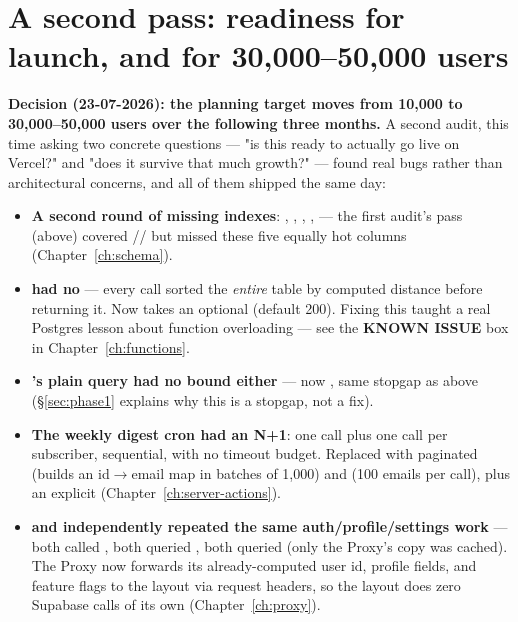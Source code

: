 \section{A second pass: readiness for launch, and for 30,000--50,000 users}
\label{sec:scaling-audit}

\textbf{Decision (23-07-2026): the planning target moves from 10,000 to 30,000--50,000 users over the following three months.} A second audit, this time asking two concrete questions — "is this ready to actually go live on Vercel?" and "does it survive that much growth?" — found real bugs rather than architectural concerns, and all of them shipped the same day:

\begin{itemize}
  \item \textbf{A second round of missing indexes}: , , , ,  — the first audit's pass (above) covered // but missed these five equally hot columns (Chapter~\ref{ch:schema}).
  \item \textbf{ had no } — every call sorted the \emph{entire}  table by computed distance before returning it. Now takes an optional  (default 200). Fixing this taught a real Postgres lesson about function overloading — see the \textbf{KNOWN ISSUE} box in Chapter~\ref{ch:functions}.
  \item \textbf{'s plain query had no bound either} — now , same stopgap as above (\S\ref{sec:phase1} explains why this is a stopgap, not a fix).
  \item \textbf{The weekly digest cron had an N+1}: one  call plus one  call per subscriber, sequential, with no timeout budget. Replaced with paginated  (builds an id$\to$email map in batches of 1,000) and  (100 emails per call), plus an explicit  (Chapter~\ref{ch:server-actions}).
  \item \textbf{ and  independently repeated the same auth/profile/settings work} — both called , both queried , both queried  (only the Proxy's copy was cached). The Proxy now forwards its already-computed user id, profile fields, and feature flags to the layout via request headers, so the layout does zero Supabase calls of its own (Chapter~\ref{ch:proxy}).

\end{itemize}
